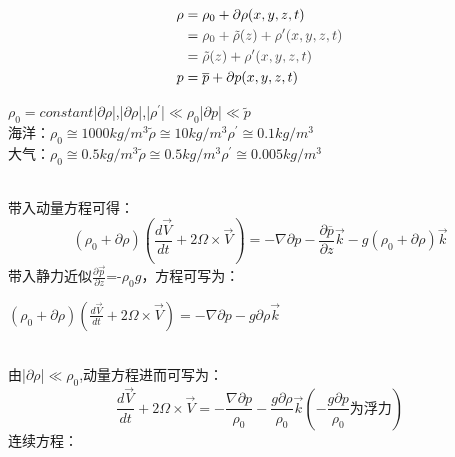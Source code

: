 \documentclass[cn, twoside]{myModel}
\begin{document}
\begin{itemize}
			   		\begin{minipage}{5.cm}
			   			\begin{equation*} 
			   				\begin{split}
			   					\rho&=\rho_{0}+\partial\rho(x,y,z,t)\\
			   						&=\textcolor{darkgray}{\rho_{0}+\tilde{\rho}(z)+\rho^{\prime}(x,y,z,t)} \\
			   						&=\textcolor{darkgray}{\tilde{\rho}(z)+\rho^{\prime}(x,y,z,t)} \\
			   					p&=\overline{p}+\partial{p}(x,y,z,t)
			   				\end{split}
			   			\end{equation*}
			   		\end{minipage}
			   		\begin{minipage}{10.5cm}
			   			\centering
			   			$\rho_{0}=constant$\quad|$\partial \rho$|,|$\partial \rho$|,|$\rho^{\prime}$|$\ll$$\rho_{0}$\quad |$\partial p$|$\ll$$\tilde{p}$ \\
			   			\textcolor{blue!70!black}{海洋：$\rho_{0}\cong1000kg/m^{3}$\quad $\tilde{\rho}\cong10kg/m^3$\quad$\rho^{\prime}\cong0.1kg/m^{3}$} \\
			   			\textcolor{green!30!black}{大气：$\rho_{0}\cong0.5kg/m^{3}$\quad $\tilde{\rho}\cong0.5kg/m^3$\quad$\rho^{\prime}\cong0.005kg/m^{3}$}
			   		\end{minipage} \\
			   		带入动量方程可得：
			   		$$ 
			   		(\rho_{0}+\partial{\rho})\left(\frac{d\overrightarrow{V}}{dt}+2\Omega\times\overrightarrow{V}\right)=-\nabla\partial{p}-\frac{\partial \overline{p}}{\partial z}\overrightarrow{k}-g(\rho_{0}+\partial \rho)\overrightarrow{k}
			   		$$
			   		带入静力近似$\frac{\partial \overrightarrow{p}}{\partial z}$=-$\rho_{0}g$，方程可写为：
			   		\begin{minipage}{8cm}
			   			\centering
			   			$(\rho_{0}+\partial{\rho})\left(\frac{d\overrightarrow{V}}{dt}+2\Omega\times\overrightarrow{V}\right)=-\nabla\partial{p}-g\partial\rho\overrightarrow{k}$
			   		\end{minipage} \\
			   		由|$\partial \rho$|$\ll$$\rho_{0}$,\textcolor{red!70!white}{动量方程}进而可写为：
			   		$$
			   			\frac{d\overrightarrow{V}}{dt}+2\Omega\times\overrightarrow{V}=-\frac{\nabla\partial p}{\rho_{0}}-\frac{g\partial \rho}{\rho_{0}}\overrightarrow{k}(-\frac{g\partial p}{\rho_{0}}\mbox{为浮力})
					$$
			   		连续方程：
			   		\begin{minipage}{2cm}

\end{minipage}$$
\end{itemize}
\end{document}
